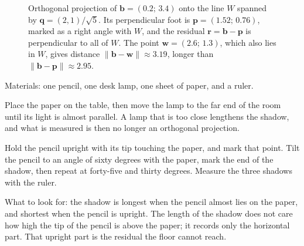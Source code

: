 \begin{figure}[htbp]
\centering
{}
\caption{Orthogonal projection of $\mathbf{b}=(0.2;\,3.4)$ onto the line $W$
spanned by $\mathbf{q}=(2,1)/\sqrt{5}$. Its perpendicular foot is
$\mathbf{p}=(1.52;\,0.76)$, marked as a right angle with $W$, and the residual
$\mathbf{r}=\mathbf{b}-\mathbf{p}$ is perpendicular to all of $W$. The point
$\mathbf{w}=(2.6;\,1.3)$, which also lies in $W$, gives distance
$\|\mathbf{b}-\mathbf{w}\|\approx3.19$, longer than
$\|\mathbf{b}-\mathbf{p}\|\approx2.95$.}
\label{fig:proyeksi-sisa}
\end{figure}

\begin{tangan}
Materials: one pencil, one desk lamp, one sheet of paper, and a ruler.

Place the paper on the table, then move the lamp to the far end of the room until its light is almost parallel. A lamp that is too close lengthens the shadow, and what is measured is then no longer an orthogonal projection.

Hold the pencil upright with its tip touching the paper, and mark that point. Tilt the pencil to an angle of sixty degrees with the paper, mark the end of the shadow, then repeat at forty-five and thirty degrees. Measure the three shadows with the ruler.

What to look for: the shadow is longest when the pencil almost lies on the paper, and shortest when the pencil is upright. The length of the shadow does not care how high the tip of the pencil is above the paper; it records only the horizontal part. That upright part is the residual the floor cannot reach.
\end{tangan}

